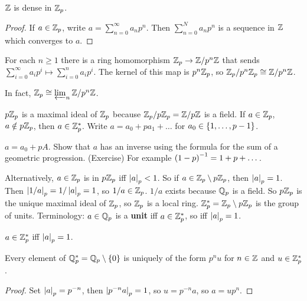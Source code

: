 \begin{corollary}
$ \mathbb{Z} $ is dense in $ \mathbb{Z}_p $.
\end{corollary}

\begin{proof}
If $ a \in \mathbb{Z}_p $, write $ a = \sum_{n = 0}^\infty a_np^n $. Then $ \sum_{n = 0}^N a_np^n $ is a sequence in $ \mathbb{Z} $ which converges to $ a $.
\end{proof}

For each $ n \ge 1 $ there is a ring homomorphism $ \mathbb{Z}_p \to \mathbb{Z} / p^n\mathbb{Z} $ that sends $ \sum_{i = 0}^\infty a_ip^i \mapsto \sum_{i = 0}^n a_ip^i $. The kernel of this map is $ p^n\mathbb{Z}_p $, so $ \mathbb{Z}_p / p^n\mathbb{Z}_p \cong \mathbb{Z} / p^n\mathbb{Z} $.

\begin{note*}
In fact, $ \mathbb{Z}_p \cong \varprojlim_n \mathbb{Z} / p^n\mathbb{Z} $.
\end{note*}

\pagebreak

$ p\mathbb{Z}_p $ is a maximal ideal of $ \mathbb{Z}_p $ because $ \mathbb{Z}_p / p\mathbb{Z}_p = \mathbb{Z} / p\mathbb{Z} $ is a field. If $ a \in \mathbb{Z}_p $, $ a \notin p\mathbb{Z}_p $, then $ a \in \mathbb{Z}_p^* $. Write $ a = a_0 + pa_1 + \dots $ for $ a_0 \in \left\{ 1, \dots, p - 1 \right\} $.

\begin{example*}
$ a = a_0 + pA $. Show that $ a $ has an inverse using the formula for the sum of a geometric progression. (Exercise) For example $ \left( 1 - p \right)^{-1} = 1 + p + \dots $.
\end{example*}

Alternatively, $ a \in \mathbb{Z}_p $ is in $ p\mathbb{Z}_p $ iff $ \left\lvert a \right\rvert_p < 1 $. So if $ a \in \mathbb{Z}_p \setminus p\mathbb{Z}_p $, then $ \left\lvert a \right\rvert_p = 1 $. Then $ \left\lvert 1 / a \right\rvert_p = 1 / \left\lvert a \right\rvert_p = 1 $, so $ 1 / a \in \mathbb{Z}_p $. $ 1 / a $ exists because $ \mathbb{Q}_p $ is a field. So $ p\mathbb{Z}_p $ is the unique maximal ideal of $ \mathbb{Z}_p $, so $ \mathbb{Z}_p $ is a local ring. $ \mathbb{Z}_p^* = \mathbb{Z}_p \setminus p\mathbb{Z}_p $ is the group of units. Terminology: $ a \in \mathbb{Q}_p $ is a \textbf{unit} iff $ a \in \mathbb{Z}_p^* $, so iff $ \left\lvert a \right\rvert_p = 1 $.

\begin{lemma}
$ a \in \mathbb{Z}_p^* $ iff $ \left\lvert a \right\rvert_p = 1 $.
\end{lemma}

\begin{corollary}
Every element of $ \mathbb{Q}_p^* = \mathbb{Q}_p \setminus \left\{ 0 \right\} $ is uniquely of the form $ p^nu $ for $ n \in \mathbb{Z} $ and $ u \in \mathbb{Z}_p^* $.
\end{corollary}

\begin{proof}
Set $ \left\lvert a \right\rvert_p = p^{-n} $, then $ \left\lvert p^{-n}a \right\rvert_p = 1 $, so $ u = p^{-n}a $, so $ a = up^n $.
\end{proof}

